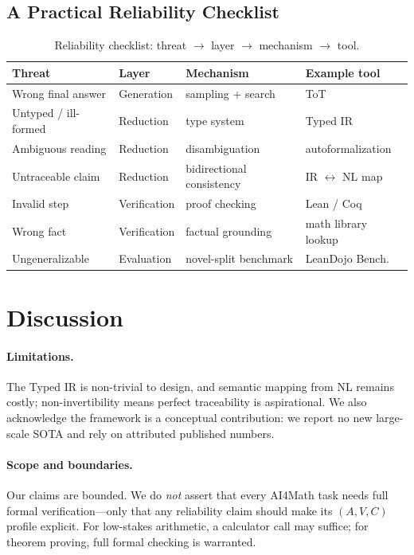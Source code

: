 \documentclass[11pt]{article}
\begin{document}
\subsection{A Practical Reliability Checklist}
\label{sec:checklist}
\begin{table}[t]
\centering
\caption{Reliability checklist: threat $\rightarrow$ layer $\rightarrow$ mechanism $\rightarrow$ tool.}
\label{tab:checklist}
\begin{tabular}{@{}llll@{}}
\toprule
Threat & Layer & Mechanism & Example tool \\
\midrule
Wrong final answer & Generation & sampling + search & ToT~\cite{yao2023tree} \\
Untyped / ill-formed & Reduction & type system & Typed IR \\
Ambiguous reading & Reduction & disambiguation & autoformalization~\cite{wu2022autoformalization} \\
Untraceable claim & Reduction & bidirectional consistency & IR $\leftrightarrow$ NL map \\
Invalid step & Verification & proof checking & Lean / Coq \\
Wrong fact & Verification & factual grounding & math library lookup \\
Ungeneralizable & Evaluation & novel-split benchmark & LeanDojo Bench.~\cite{yang2023leandojo} \\
\bottomrule
\end{tabular}
\end{table}

\section{Discussion}
\label{sec:discussion}

\paragraph{Limitations.}
The Typed IR is non-trivial to design, and semantic mapping from NL remains costly;
non-invertibility means perfect traceability is aspirational. We also acknowledge the
framework is a conceptual contribution: we report no new large-scale SOTA and rely on
attributed published numbers.

\paragraph{Scope and boundaries.}
Our claims are bounded. We do \emph{not} assert that every AI4Math task needs full
formal verification---only that any reliability claim should make its $(A,V,C)$ profile
explicit. For low-stakes arithmetic, a calculator call may suffice; for theorem proving,
full formal checking is warranted.
\end{document}
